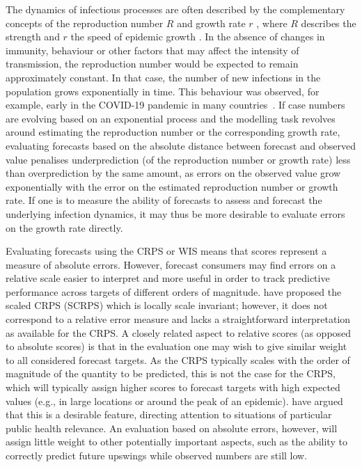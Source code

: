 \documentclass{article}
\begin{document}
The dynamics of infectious processes are often described by the complementary concepts of the reproduction number $R$ \citep{gosticPracticalConsiderationsMeasuring2020} and growth rate $r$ \citep{wallingaHowGenerationIntervals2007}, where $R$ describes the strength and $r$ the speed of epidemic growth \citep{dushoffSpeedStrengthEpidemic2021}.
In the absence of changes in immunity, behaviour or other factors that may affect the intensity of transmission, the reproduction number would be expected to remain approximately constant.
In that case, the number of new infections in the population grows exponentially in time.
This behaviour was observed, for example, early in the COVID-19 pandemic in many countries~\citep{pellisChallengesControlCOVID192021}.
If case numbers are evolving based on an exponential process and the  modelling task revolves around estimating the reproduction number or the corresponding growth rate, evaluating forecasts based on the absolute distance between forecast and observed value penalises underprediction (of the reproduction number or growth rate) less than overprediction by the same amount, as errors on the observed value grow exponentially with the error on the estimated reproduction number or growth rate.
If one is to measure the ability of forecasts to assess and forecast the underlying infection dynamics, it may thus be more desirable to evaluate errors on the growth rate directly.

Evaluating forecasts using the CRPS or WIS means that scores represent a measure of absolute errors. However, forecast consumers may find errors on a relative scale easier to interpret and more useful in order to track predictive performance across targets of different orders of magnitude. 
\cite{bolinLocalScaleInvariance2021} have proposed the scaled CRPS (SCRPS) which is locally scale invariant; however, it does not correspond to a relative error measure and lacks a straightforward interpretation as available for the CRPS. %
A closely related aspect to relative scores (as opposed to absolute scores) is that in the evaluation one may wish to give similar weight to all considered forecast targets. As the CRPS typically scales with the order of magnitude of the quantity to be predicted, this is not the case for the CRPS, which will typically assign higher scores to forecast targets with high expected values (e.g., in large locations or around the peak of an epidemic). \cite{bracherEvaluatingEpidemicForecasts2021} have argued that this is a desirable feature, directing attention to situations of particular public health relevance. An evaluation based on absolute errors, however, will assign little weight to other potentially important aspects, such as the ability to correctly predict future upswings while observed numbers are still low. 
\end{document}
